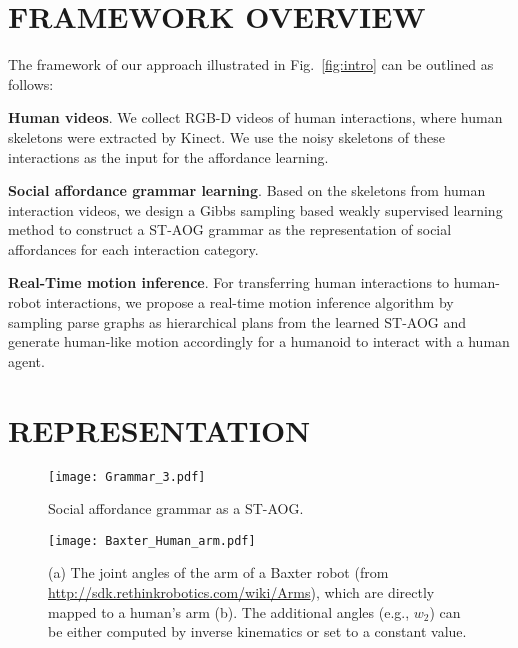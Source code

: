 \documentclass[letterpaper, 10 pt, conference]{ieeeconf}  %
\begin{document}

\section{FRAMEWORK OVERVIEW}

The framework of our approach illustrated in Fig.~\ref{fig:intro} can be outlined as follows:

\textbf{Human videos}. We collect RGB-D videos of human interactions, where human skeletons were extracted by Kinect. We use the noisy skeletons of these interactions as the input for the affordance learning.

\textbf{Social affordance grammar learning}. Based on the skeletons from human interaction videos, we design a Gibbs sampling based weakly supervised learning method to construct a ST-AOG grammar as the representation of social affordances for each interaction category.

\textbf{Real-Time motion inference}. For transferring human interactions to human-robot interactions, we propose a real-time motion inference algorithm by sampling parse graphs as hierarchical plans from the learned ST-AOG and generate human-like motion accordingly for a humanoid to interact with a human agent.






\section{REPRESENTATION}

   \begin{figure}[t!]
      \centering
      \texttt{[image: Grammar\_3.pdf]}
      \vspace{-5pt}
      \caption{Social affordance grammar as a ST-AOG.}
      \vspace{-10pt}
      \label{fig:rep}
   \end{figure}
   
    \begin{figure}[t!]
      \centering
      \texttt{[image: Baxter\_Human\_arm.pdf]}
      \vspace{-10pt}
      \caption[Caption for LOF]{(a) The joint angles of the arm of a Baxter robot (from \href{http://sdk.rethinkrobotics.com/wiki/Arms}{http://sdk.rethinkrobotics.com/wiki/Arms}), which are directly mapped to a human's arm (b). The additional angles (e.g., $w_2$) can be either computed by inverse kinematics or set to a constant value.}
      \vspace{-10pt}
      \label{fig:jointangles}
   \end{figure}
   
\end{document}
